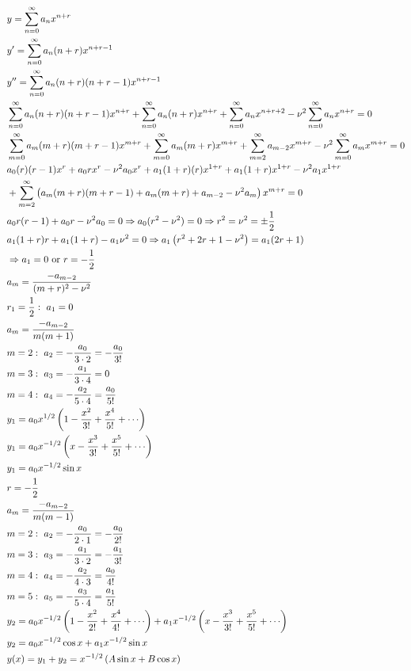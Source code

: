 \documentclass[11pt, fleqn]{article}
\begin{document}
\begin{align*}
    &y=\sum_{n=0}^\infty a_nx^{n+r}\\
    &y'=\sum_{n=0}^\infty a_n(n+r)x^{n+r-1}\\
    &y''=\sum_{n=0}^\infty a_n(n+r)(n+r-1)x^{n+r-1}\\
    &\sum_{n=0}^\infty a_n(n+r)(n+r-1)x^{n+r}+\sum_{n=0}^\infty a_n(n+r)x^{n+r}+\sum_{n=0}^\infty a_n x^{n+r+2}-\nu^2\sum_{n=0}^\infty a_n x^{n+r}=0\\
    &\sum_{m=0}^\infty a_m(m+r)(m+r-1)x^{m+r}+\sum_{m=0}^\infty a_m(m+r)x^{m+r}+\sum_{m=2}^\infty a_{m-2}x^{m+r}-\nu^2\sum_{m=0}^\infty a_m x^{m+r}=0\\
    &a_0(r)(r-1)x^r+a_0rx^r-\nu^2 a_0 x^r+a_1(1+r)(r)x^{1+r}+a_1(1+r)x^{1+r}-\nu^2a_1 x^{1+r}\\
    &+\sum_{m=2}^\infty \brround{a_m(m+r)(m+r-1)+a_m(m+r)+a_{m-2}-\nu^2a_m}x^{m+r}=0\\
    &a_0r(r-1)+a_0r-\nu^2a_0=0\Ra a_0(r^2-\nu^2)=0\Ra r^2=\nu^2=\pm\frac{1}{2}\\
    &a_1(1+r)r+a_1(1+r)-a_1\nu^2=0\Ra a_1\brround{r^2+2r+1-\nu^2}=a_1(2r+1)\\
    &\Ra a_1=0\text{ or }r=-\frac{1}{2}\\
    &a_m=\frac{-a_{m-2}}{(m+r)^2-\nu^2}\\
    &r_1=\frac{1}{2}:\ a_1=0\\
    &a_m=\frac{-a_{m-2}}{m(m+1)}\\
    &m=2:\ a_2=-\frac{a_0}{3\cdot2}=-\frac{a_0}{3!}\\
    &m=3:\ a_3=-\frac{a_1}{3\cdot4}=0\\
    &m=4:\ a_4=-\frac{a_2}{5\cdot4}=\frac{a_0}{5!}\\
    &y_1=a_0x^{1/2}\brround{1-\frac{x^2}{3!}+\frac{x^4}{5!}+\cdots}\\
    &y_1=a_0x^{-1/2}\brround{x-\frac{x^3}{3!}+\frac{x^5}{5!}+\cdots}\\
    &y_1=a_0x^{-1/2}\sin x\\
    &r=-\frac{1}{2}\\
    &a_m=\frac{-a_{m-2}}{m(m-1)}\\
    &m=2:\ a_2=-\frac{a_0}{2\cdot1}=-\frac{a_0}{2!}\\
    &m=3:\ a_3=-\frac{a_1}{3\cdot2}=-\frac{a_1}{3!}\\
    &m=4:\ a_4=-\frac{a_2}{4\cdot3}=\frac{a_0}{4!}\\
    &m=5:\ a_5=-\frac{a_3}{5\cdot4}=\frac{a_1}{5!}\\
    &y_2=a_0x^{-1/2}\brround{1-\frac{x^2}{2!}+\frac{x^4}{4!}+\cdots}+a_1x^{-1/2}\brround{x-\frac{x^3}{3!}+\frac{x^5}{5!}+\cdots}\\
    &y_2=a_0x^{-1/2}\cos x+a_1x^{-1/2}\sin x\\
    &y(x)=y_1+y_2=x^{-1/2}\brround{A\sin x+B\cos x}
\end{align*}
\end{document}
